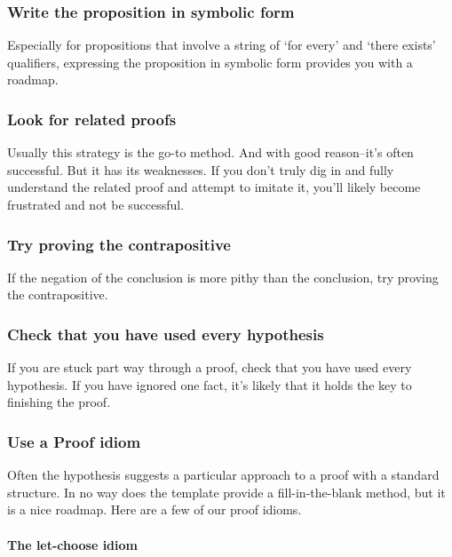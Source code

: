 \documentclass[12pt,fleqn]{article}
\newcounter{ex}\setcounter{ex}{0}
\newcounter{id}\setcounter{id}{0}
\newcounter{se}\setcounter{se}{0}
\begin{document}
 \subsubsection{Write the proposition in symbolic form} 
 
 Especially for propositions 
 that involve a string of `for every' and `there exists' qualifiers,
 expressing the proposition in symbolic form provides you with 
 a roadmap.

 \subsubsection{Look for related proofs} 
 
 Usually this strategy is the go-to 
 method. And with good reason--it's often successful. But it has its 
 weaknesses. If you don't truly dig in and fully understand the related
 proof and attempt to imitate it, you'll likely  become frustrated and 
 not be successful. 

 \subsubsection{Try proving the contrapositive} 
 
 If the negation of the conclusion is 
 more pithy than the conclusion, try proving the contrapositive.


 \subsubsection{Check that you have used every hypothesis}

 If you are stuck part way through a proof, check that you have
 used every hypothesis.  If you have ignored one fact,  it's likely
 that it holds the key to finishing the proof.
 
 

\subsubsection{Use a  Proof idiom}

Often the hypothesis suggests a particular approach to a proof with a standard structure.  In no way does
the template provide a fill-in-the-blank method, but it is a nice roadmap.  
Here are a few of our proof idioms.

\paragraph{The let-choose idiom}
\end{document}
